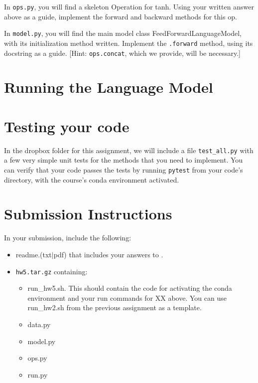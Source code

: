 \documentclass[11pt]{article}
\begin{document}
\vspace{2em}
  In \texttt{ops.py}, you will find a skeleton Operation for tanh.  Using your written answer above as a guide, implement the forward and backward methods for this op.

\vspace{2em}
 In \texttt{model.py}, you will find the main model class FeedForwardLanguageModel, with its initialization method written.  Implement the \texttt{.forward} method, using its docstring as a guide.  [Hint: \texttt{ops.concat}, which we provide, will be necessary.]

\vspace{2em}


\section{Running the Language Model}



\section{Testing your code}

In the dropbox folder for this assignment, we will include a file \texttt{test\_all.py} with a few very simple unit tests for the methods that you need to implement.  You can verify that your code passes the tests by running \texttt{pytest} from your code's directory, with the course's conda environment activated.


\section*{Submission Instructions}

In your submission, include the following:
\begin{itemize}
  \item readme.(txt$\mid$pdf) that includes your answers to . 
  \item \texttt{hw5.tar.gz} containing:
  \begin{itemize}
    \item run\_hw5.sh.  This should contain the code for activating the conda environment and your run commands for XX above.  You can use run\_hw2.sh from the previous assignment as a template.
    \item data.py
    \item model.py
    \item ops.py
    \item run.py
  \end{itemize}
\end{itemize}
\end{document}
